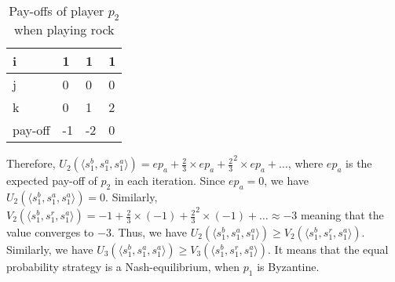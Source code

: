 \begin{itemize}
	\begin{table}[]
		\centering
		\caption{Pay-offs of player $p_2$ when playing rock}\label{tab:3}
		\label{rbh}
		\begin{tabular}{|l|l|l|l|}
			\hline
			i & 1 & 1 & 1\\
			\hline
			j & 0 & 0 & 0\\
			\hline 
			k & 0 & 1 & 2 \\
			\hline
			pay-off & -1 & -2 & 0\\
			\hline 
			
		\end{tabular}
	\end{table}
	
\end{itemize}

Therefore, $U_2(\langle s_1^b,s_1^a,s_1^a  \rangle )= ep_a + \frac{2}{3} \times ep_a + \frac{2}{3}^2 \times ep_a + \dots$, where $ep_a$ is the expected pay-off of $p_2$ in each iteration. Since $ep_a=0$, we have $U_2(\langle s_1^b,s_1^a,s_1^a  \rangle )=0$. Similarly, $V_2(\langle s_1^b,s_1^r,s_1^a  \rangle )= -1 + \frac{2}{3} \times (-1)+ \frac{2}{3}^2 \times (-1) + \dots \approx -3$ meaning that the value converges to $-3$.
Thus, we have $U_2(\langle s_1^b,s_1^a,s_1^a  \rangle ) \geq V_2(\langle s_1^b,s_1^r,s_1^a  \rangle )$. Similarly, we have $U_3(\langle s_1^b,s_1^a,s_1^a  \rangle ) \geq V_3(\langle s_1^b,s_1^r,s_1^a  \rangle )$. It means that the equal probability strategy is a Nash-equilibrium, when $p_1$ is Byzantine. 

